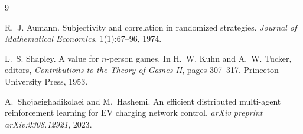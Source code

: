 \documentclass{article}
\begin{document}
{\small
\begin{thebibliography}{9}

R.~J. Aumann.
\newblock Subjectivity and correlation in randomized strategies.
\newblock \emph{Journal of Mathematical Economics}, 1(1):67--96, 1974.

L.~S. Shapley.
\newblock A value for $n$-person games.
\newblock In H.~W. Kuhn and A.~W. Tucker, editors, \emph{Contributions to the Theory of Games II}, pages 307--317. Princeton University Press, 1953.

A.~Shojaeighadikolaei and M.~Hashemi.
\newblock An efficient distributed multi-agent reinforcement learning for EV charging network control.
\newblock \emph{arXiv preprint arXiv:2308.12921}, 2023.

\end{thebibliography}
}
\end{document}
